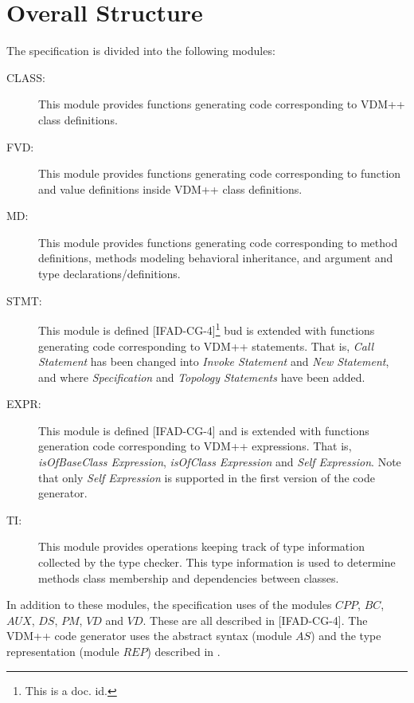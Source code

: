 \documentclass[a4paper,dvips]{article}
\begin{document}
\section{Overall Structure}

The specification is divided into the following modules:

\begin{description}
\item[CLASS:] This module provides functions generating code
  corresponding to VDM++ class definitions.

\item[FVD:] This module provides functions generating code
  corresponding to function and value definitions inside VDM++ class
  definitions.

\item[MD:] This module provides functions generating code
  corresponding to method definitions, methods modeling behavioral
  inheritance, and argument and type declarations/definitions.

\item[STMT:] This module is defined [IFAD-CG-4]\footnote{This is a
    doc. id.} bud is extended with functions generating code
  corresponding to VDM++ statements. That is, {\em Call Statement\/}
  has been changed into {\em Invoke Statement\/} and {\em New
    Statement\/}, and where {\em Specification} and {\em Topology
    Statements} have been added.

\item[EXPR:] This module is defined [IFAD-CG-4] and is extended with
  functions generation code corresponding to VDM++ expressions. That
  is, {\em isOfBaseClass Expression},
  {\em isOfClass Expression} and {\em Self Expression\/}. Note that
  only {\em Self Expression\/} is supported in the first version of
  the code generator.

\item[TI:] This module provides operations keeping track of type
  information collected by the type checker. This type information is
  used to determine methods class membership and dependencies between
  classes.

\end{description}

In addition to these modules, the specification uses of the modules
$CPP$, $BC$, $AUX$, $DS$, $PM$, $VD$ and $VD$. These are all described
in [IFAD-CG-4]. The VDM++ code generator uses the abstract syntax
(module $AS$) and the type representation (module $REP$) described in
\cite{Lassen&93a}.
\end{document}
